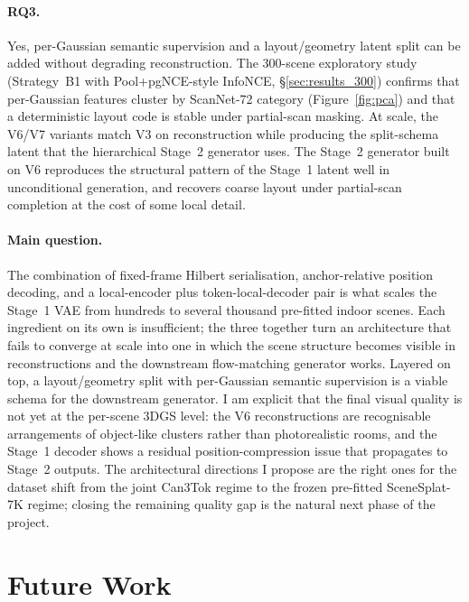 \paragraph{RQ3.} Yes, per-Gaussian semantic supervision and a layout/geometry latent split can be added without degrading reconstruction. The 300-scene exploratory study (Strategy~B1 with Pool+pgNCE-style InfoNCE, \S\ref{sec:results_300}) confirms that per-Gaussian features cluster by ScanNet-72 category (Figure~\ref{fig:pca}) and that a deterministic layout code is stable under partial-scan masking. At scale, the V6/V7 variants match V3 on reconstruction while producing the split-schema latent that the hierarchical Stage~2 generator uses. The Stage~2 generator built on V6 reproduces the structural pattern of the Stage~1 latent well in unconditional generation, and recovers coarse layout under partial-scan completion at the cost of some local detail.

\paragraph{Main question.} The combination of fixed-frame Hilbert serialisation, anchor-relative position decoding, and a local-encoder plus token-local-decoder pair is what scales the Stage~1 VAE from hundreds to several thousand pre-fitted indoor scenes. Each ingredient on its own is insufficient; the three together turn an architecture that fails to converge at scale into one in which the scene structure becomes visible in reconstructions and the downstream flow-matching generator works. Layered on top, a layout/geometry split with per-Gaussian semantic supervision is a viable schema for the downstream generator. I am explicit that the final visual quality is not yet at the per-scene 3DGS level: the V6 reconstructions are recognisable arrangements of object-like clusters rather than photorealistic rooms, and the Stage~1 decoder shows a residual position-compression issue that propagates to Stage~2 outputs. The architectural directions I propose are the right ones for the dataset shift from the joint Can3Tok regime to the frozen pre-fitted SceneSplat-7K regime; closing the remaining quality gap is the natural next phase of the project.

\section{Future Work}
\label{sec:conc_future}

